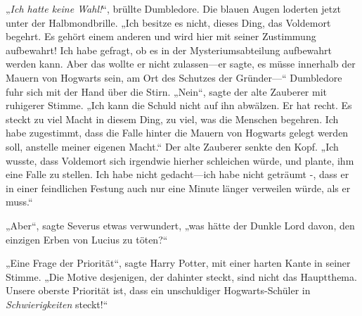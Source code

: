„\emph{Ich hatte keine Wahl!}“, brüllte Dumbledore.
Die blauen Augen loderten jetzt unter der Halbmondbrille.
„Ich besitze es nicht, dieses Ding, das Voldemort begehrt. Es gehört einem anderen und wird hier mit seiner Zustimmung aufbewahrt! Ich habe gefragt, ob es in der Mysteriumsabteilung aufbewahrt werden kann. Aber das wollte er nicht zulassen—er sagte, es müsse innerhalb der Mauern von Hogwarts sein, am Ort des Schutzes der Gründer—“
Dumbledore fuhr sich mit der Hand über die Stirn.
„Nein“, sagte der alte Zauberer mit ruhigerer Stimme. „Ich kann die Schuld nicht auf ihn abwälzen. Er hat recht. Es steckt zu viel Macht in diesem Ding, zu viel, was die Menschen begehren. Ich habe zugestimmt, dass die Falle hinter die Mauern von Hogwarts gelegt werden soll, anstelle meiner eigenen Macht.“
Der alte Zauberer senkte den Kopf.
„Ich wusste, dass Voldemort sich irgendwie hierher schleichen würde, und plante, ihm eine Falle zu stellen. Ich habe nicht gedacht—ich habe nicht geträumt -, dass er in einer feindlichen Festung auch nur eine Minute länger verweilen würde, als er muss.“

„Aber“, sagte Severus etwas verwundert, „was hätte der Dunkle Lord davon, den einzigen Erben von Lucius zu töten?“

„Eine Frage der Priorität“, sagte Harry Potter, mit einer harten Kante in seiner Stimme. „Die Motive desjenigen, der dahinter steckt, sind nicht das Hauptthema. Unsere oberste Priorität ist, dass ein unschuldiger Hogwarts-Schüler in \emph{Schwierigkeiten} steckt!“

